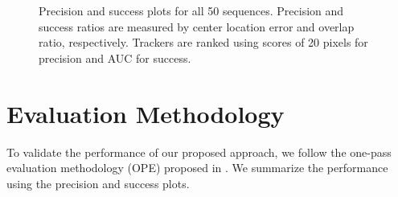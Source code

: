 \begin{figure}[t]
\centering
{}
\caption{\small  Precision and success plots for all 50 sequences. Precision and success
		ratios are measured by center location error and overlap ratio,
		respectively. Trackers are ranked using scores of 20 pixels for
		precision and AUC for success.}
\label{fig:results}
\end{figure}

\section{Evaluation Methodology}
To validate the performance of our proposed approach, we follow the one-pass
evaluation methodology (OPE) proposed in \cite{Wu2013}. 
We summarize the performance using the precision and success plots.

